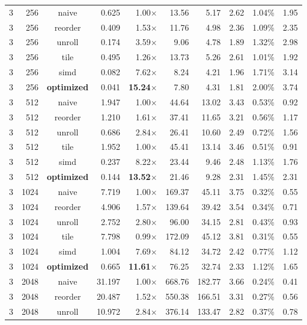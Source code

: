 \documentclass[11pt,a4paper]{article}
\begin{document}
{\begin{longtable}{rrcrrrrrrr}
3 & 256 & naive & 0.625 & 1.00$\times$ & 13.56 & 5.17 & 2.62 & 1.04\% & 1.95 \\
3 & 256 & reorder & 0.409 & 1.53$\times$ & 11.76 & 4.98 & 2.36 & 1.09\% & 2.35 \\
3 & 256 & unroll & 0.174 & 3.59$\times$ & 9.06 & 4.78 & 1.89 & 1.32\% & 2.98 \\
3 & 256 & tile & 0.495 & 1.26$\times$ & 13.73 & 5.26 & 2.61 & 1.01\% & 1.92 \\
3 & 256 & simd & 0.082 & 7.62$\times$ & 8.24 & 4.21 & 1.96 & 1.71\% & 3.14 \\
3 & 256 & \textbf{optimized} & 0.041 & \textbf{15.24$\times$} & 7.80 & 4.31 & 1.81 & 2.00\% & 3.74 \\
\midrule
3 & 512 & naive & 1.947 & 1.00$\times$ & 44.64 & 13.02 & 3.43 & 0.53\% & 0.92 \\
3 & 512 & reorder & 1.210 & 1.61$\times$ & 37.41 & 11.65 & 3.21 & 0.56\% & 1.17 \\
3 & 512 & unroll & 0.686 & 2.84$\times$ & 26.41 & 10.60 & 2.49 & 0.72\% & 1.56 \\
3 & 512 & tile & 1.952 & 1.00$\times$ & 45.41 & 13.14 & 3.46 & 0.51\% & 0.91 \\
3 & 512 & simd & 0.237 & 8.22$\times$ & 23.44 & 9.46 & 2.48 & 1.13\% & 1.76 \\
3 & 512 & \textbf{optimized} & 0.144 & \textbf{13.52$\times$} & 21.46 & 9.28 & 2.31 & 1.45\% & 2.31 \\
\midrule
3 & 1024 & naive & 7.719 & 1.00$\times$ & 169.37 & 45.11 & 3.75 & 0.32\% & 0.55 \\
3 & 1024 & reorder & 4.906 & 1.57$\times$ & 139.64 & 39.42 & 3.54 & 0.34\% & 0.71 \\
3 & 1024 & unroll & 2.752 & 2.80$\times$ & 96.00 & 34.15 & 2.81 & 0.43\% & 0.93 \\
3 & 1024 & tile & 7.798 & 0.99$\times$ & 172.09 & 45.12 & 3.81 & 0.31\% & 0.55 \\
3 & 1024 & simd & 1.004 & 7.69$\times$ & 84.12 & 34.72 & 2.42 & 0.77\% & 1.12 \\
3 & 1024 & \textbf{optimized} & 0.665 & \textbf{11.61$\times$} & 76.25 & 32.74 & 2.33 & 1.12\% & 1.65 \\
\midrule
3 & 2048 & naive & 31.197 & 1.00$\times$ & 668.76 & 182.77 & 3.66 & 0.24\% & 0.41 \\
3 & 2048 & reorder & 20.487 & 1.52$\times$ & 550.38 & 166.51 & 3.31 & 0.27\% & 0.56 \\
3 & 2048 & unroll & 10.972 & 2.84$\times$ & 376.14 & 133.47 & 2.82 & 0.37\% & 0.78 \\

\end{longtable}}
\end{document}
